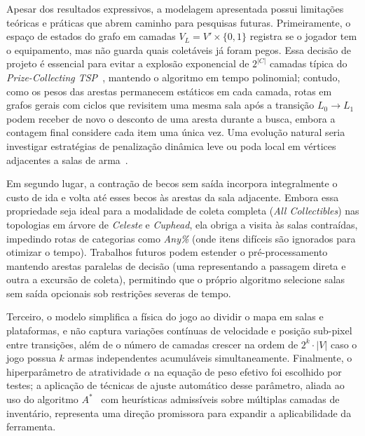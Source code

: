 \documentclass[conference]{IEEEtran}
\begin{document}
Apesar dos resultados expressivos, a modelagem apresentada possui limita\c{c}\~oes te\'oricas e pr\'aticas que abrem caminho para pesquisas futuras. Primeiramente, o espa\c{c}o de estados do grafo em camadas $V_L = V' \times \{0, 1\}$ registra se o jogador tem o equipamento, mas n\~ao guarda quais colet\'aveis j\'a foram pegos. Essa decis\~ao de projeto \'e essencial para evitar a explos\~ao exponencial de $2^{|C|}$ camadas t\'ipica do \textit{Prize-Collecting TSP}~\cite{balas1989,vansteenwegen2011}, mantendo o algoritmo em tempo polinomial; contudo, como os pesos das arestas permanecem est\'aticos em cada camada, rotas em grafos gerais com ciclos que revisitem uma mesma sala ap\'os a transi\c{c}\~ao $L_0 \to L_1$ podem receber de novo o desconto de uma aresta durante a busca, embora a contagem final considere cada item uma \'unica vez. Uma evolu\c{c}\~ao natural seria investigar estrat\'egias de penaliza\c{c}\~ao din\^amica leve ou poda local em v\'ertices adjacentes a salas de arma~\cite{aversa2016}.

Em segundo lugar, a contra\c{c}\~ao de becos sem sa\'ida incorpora integralmente o custo de ida e volta at\'e esses becos \`as arestas da sala adjacente. Embora essa propriedade seja ideal para a modalidade de coleta completa (\textit{All Collectibles}) nas topologias em \'arvore de \textit{Celeste} e \textit{Cuphead}, ela obriga a visita \`as salas contra\'idas, impedindo rotas de categorias como \textit{Any\%} (onde itens dif\'iceis s\~ao ignorados para otimizar o tempo). Trabalhos futuros podem estender o pr\'e-processamento mantendo arestas paralelas de decis\~ao (uma representando a passagem direta e outra a excurs\~ao de coleta), permitindo que o pr\'oprio algoritmo selecione salas sem sa\'ida opcionais sob restri\c{c}\~oes severas de tempo.

Terceiro, o modelo simplifica a f\'isica do jogo ao dividir o mapa em salas e plataformas, e n\~ao captura varia\c{c}\~oes cont\'inuas de velocidade e posi\c{c}\~ao sub-pixel entre transi\c{c}\~oes, al\'em de o n\'umero de camadas crescer na ordem de $2^k \cdot |V|$ caso o jogo possua $k$ armas independentes acumul\'aveis simultaneamente. Finalmente, o hiperparâmetro de atratividade $\alpha$ na equação de peso efetivo foi escolhido por testes; a aplica\c{c}\~ao de t\'ecnicas de ajuste autom\'atico desse par\^ametro, aliada ao uso do algoritmo $A^*$~\cite{hart1968} com heur\'isticas admiss\'iveis sobre m\'ultiplas camadas de invent\'ario, representa uma dire\c{c}\~ao promissora para expandir a aplicabilidade da ferramenta.
\end{document}
